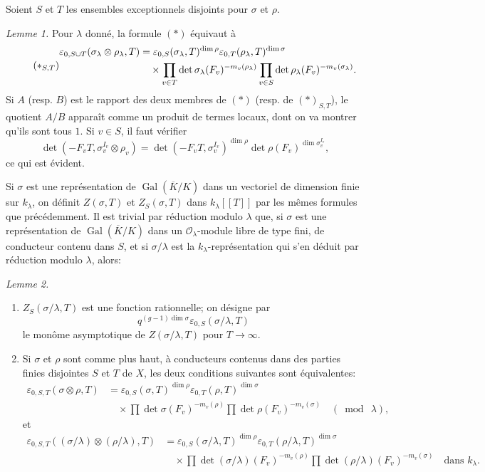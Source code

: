 \documentclass[11pt]{article}
\newcommand{\Gal}{\operatorname{Gal}}
\newcommand{\cO}{\mathcal{O}}
\newcommand{\eps}{\varepsilon}
\begin{document}
Soient \(S\) et \(T\) les ensembles exceptionnels disjoints pour \(\sigma\) et \(\rho\).

\emph{Lemme 1.} Pour \(\lambda\) donné, la formule \((*)\) équivaut à
\[
\tag{\(*_{S,T}\)}
\begin{aligned}
\eps_{0,S\cup T}(\sigma_\lambda\otimes\rho_\lambda,T)
&=\eps_{0,S}(\sigma_\lambda,T)^{\dim\rho}
  \eps_{0,T}(\rho_\lambda,T)^{\dim\sigma} \\
&\quad\times
\prod_{v\in T}\det\sigma_\lambda(F_v)^{-m_v(\rho_\lambda)}
\prod_{v\in S}\det\rho_\lambda(F_v)^{-m_v(\sigma_\lambda)} .
\end{aligned}
\]
Si \(A\) (resp. \(B\)) est le rapport des deux membres de \((*)\) (resp. de \((*)_{S,T}\)), le quotient \(A/B\) apparaît comme un produit de termes locaux, dont on va montrer qu'ils sont tous \(1\). Si \(v\in S\), il faut vérifier
\[
\det(-F_vT,\sigma_v^{I_v}\otimes\rho_v)
=
\det(-F_vT,\sigma_v^{I_v})^{\dim\rho}
\det\rho(F_v)^{\dim\sigma_v^{I_v}},
\]
ce qui est évident.

Si \(\sigma\) est une représentation de \(\Gal(\overline K/K)\) dans un vectoriel de dimension finie sur \(k_\lambda\), on définit \(Z(\sigma,T)\) et \(Z_S(\sigma,T)\) dans \(k_\lambda[[T]]\) par les mêmes formules que précédemment. Il est trivial par réduction modulo \(\lambda\) que, si \(\sigma\) est une représentation de \(\Gal(\overline K/K)\) dans un \(\cO_\lambda\)-module libre de type fini, de conducteur contenu dans \(S\), et si \(\sigma/\lambda\) est la \(k_\lambda\)-représentation qui s'en déduit par réduction modulo \(\lambda\), alors:

\emph{Lemme 2.}
\begin{enumerate}[label=(\roman*)]
\item \(Z_S(\sigma/\lambda,T)\) est une fonction rationnelle; on désigne par
\[
q^{(g-1)\dim\sigma}\eps_{0,S}(\sigma/\lambda,T)
\]
le monôme asymptotique de \(Z(\sigma/\lambda,T)\) pour \(T\to\infty\).
\item Si \(\sigma\) et \(\rho\) sont comme plus haut, à conducteurs contenus dans des parties finies disjointes \(S\) et \(T\) de \(X\), les deux conditions suivantes sont équivalentes:
\[
\tag{a}
\begin{aligned}
\eps_{0,S,T}(\sigma\otimes\rho,T)
&=\eps_{0,S}(\sigma,T)^{\dim\rho}
  \eps_{0,T}(\rho,T)^{\dim\sigma}  \\
&\quad\times
\prod \det\sigma(F_v)^{-m_v(\rho)}
\prod \det\rho(F_v)^{-m_v(\sigma)}
\quad(\bmod\ \lambda),
\end{aligned}
\]
et
\[
\tag{b}
\begin{aligned}
\eps_{0,S,T}((\sigma/\lambda)\otimes(\rho/\lambda),T)
&=\eps_{0,S}(\sigma/\lambda,T)^{\dim\rho}
  \eps_{0,T}(\rho/\lambda,T)^{\dim\sigma}  \\
&\quad\times
\prod \det(\sigma/\lambda)(F_v)^{-m_v(\rho)}
\prod \det(\rho/\lambda)(F_v)^{-m_v(\sigma)}
\quad\text{dans }k_\lambda .
\end{aligned}
\]
\end{enumerate}
\end{document}
